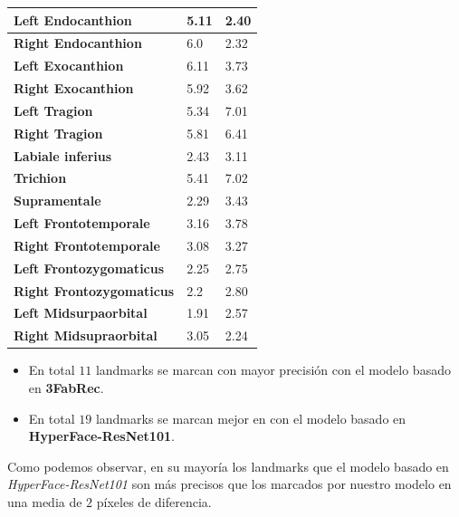\begin{table}[!ht]
\begin{tabular}{|l|l|l|}
                    \textbf{Left Endocanthion} & 5.11 & \cellcolor{green!25}2.40 \\ \hline
                    \textbf{Right Endocanthion} & 6.0 & \cellcolor{green!25}2.32 \\ \hline
                    \textbf{Left Exocanthion} & 6.11 & \cellcolor{green!25}3.73 \\ \hline
                    \textbf{Right Exocanthion} & 5.92 & \cellcolor{green!25}3.62 \\ \hline
                    \textbf{Left Tragion} & \cellcolor{green!25}5.34 & 7.01 \\ \hline
                    \textbf{Right Tragion} & \cellcolor{green!25}5.81 & 6.41 \\ \hline
                    \textbf{Labiale inferius} & \cellcolor{green!25}2.43 & 3.11 \\ \hline
                    \textbf{Trichion} & \cellcolor{green!25}5.41 & 7.02 \\ \hline
                    \textbf{Supramentale} & \cellcolor{green!25}2.29 & 3.43 \\ \hline
                    \textbf{Left Frontotemporale} & \cellcolor{green!25}3.16 & 3.78 \\ \hline
                    \textbf{Right Frontotemporale} & \cellcolor{green!25}3.08 & 3.27 \\ \hline
                    \textbf{Left Frontozygomaticus} & \cellcolor{green!25}2.25 & 2.75 \\ \hline
                    \textbf{Right Frontozygomaticus} & \cellcolor{green!25}2.2 & 2.80 \\ \hline
                    \textbf{Left Midsurpaorbital} & \cellcolor{green!25}1.91 & 2.57 \\ \hline
                    \textbf{Right Midsupraorbital} & 3.05 & \cellcolor{green!25}2.24 \\ \hline
                \end{tabular}
                \label{table:comparativa-Landmarks}
            \end{table}

            \medskip
            
            \begin{itemize}
                \item En total $11$ landmarks se marcan con mayor precisión con el modelo basado en \textbf{3FabRec}.
                \item En total $19$ landmarks se marcan mejor en con el modelo basado en \textbf{HyperFace-ResNet101}.
            \end{itemize}

            \noindent Como podemos observar, en su mayoría los landmarks que el modelo basado en \textit{HyperFace-ResNet101} son más precisos que los marcados por nuestro modelo en una media de $2$ píxeles de diferencia.
           
\endinput



